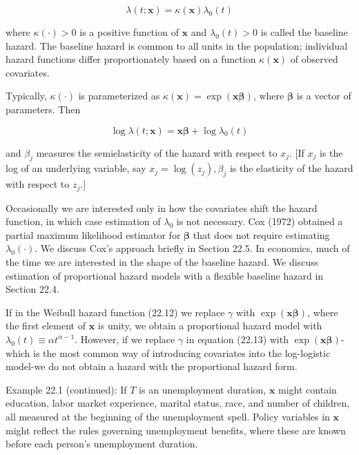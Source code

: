 \documentclass[10pt]{article}
\begin{document}
\begin{equation*}
\lambda(t ; \mathbf{x})=\kappa(\mathbf{x}) \lambda_{0}(t) \tag{22.16}
\end{equation*}


where $\kappa(\cdot)>0$ is a positive function of $\mathbf{x}$ and $\lambda_{0}(t)>0$ is called the baseline hazard. The baseline hazard is common to all units in the population; individual hazard functions differ proportionately based on a function $\kappa(\mathbf{x})$ of observed covariates.

Typically, $\kappa(\cdot)$ is parameterized as $\kappa(\mathbf{x})=\exp (\mathbf{x} \boldsymbol{\beta})$, where $\boldsymbol{\beta}$ is a vector of parameters. Then


\begin{equation*}
\log \lambda(t ; \mathbf{x})=\mathbf{x} \boldsymbol{\beta}+\log \lambda_{0}(t) \tag{22.17}
\end{equation*}


and $\beta_{j}$ measures the semielasticity of the hazard with respect to $x_{j}$. [If $x_{j}$ is the log of an underlying variable, say $x_{j}=\log \left(z_{j}\right), \beta_{j}$ is the elasticity of the hazard with respect to $z_{j}$.]

Occasionally we are interested only in how the covariates shift the hazard function, in which case estimation of $\lambda_{0}$ is not necessary. Cox (1972) obtained a partial maximum likelihood estimator for $\boldsymbol{\beta}$ that does not require estimating $\lambda_{0}(\cdot)$. We discuss Cox's approach briefly in Section 22.5. In economics, much of the time we are interested in the shape of the baseline hazard. We discuss estimation of proportional hazard models with a flexible baseline hazard in Section 22.4.

If in the Weibull hazard function (22.12) we replace $\gamma$ with $\exp (\mathbf{x} \boldsymbol{\beta})$, where the first element of $\mathbf{x}$ is unity, we obtain a proportional hazard model with $\lambda_{0}(t) \equiv \alpha t^{\alpha-1}$. However, if we replace $\gamma$ in equation (22.13) with $\exp (\mathbf{x} \boldsymbol{\beta})$-which is the most common way of introducing covariates into the log-logistic model-we do not obtain a hazard with the proportional hazard form.

Example 22.1 (continued): If $T$ is an unemployment duration, $\mathbf{x}$ might contain education, labor market experience, marital status, race, and number of children, all measured at the beginning of the unemployment spell. Policy variables in $\mathbf{x}$ might reflect the rules governing unemployment benefits, where these are known before each person's unemployment duration.
\end{document}
